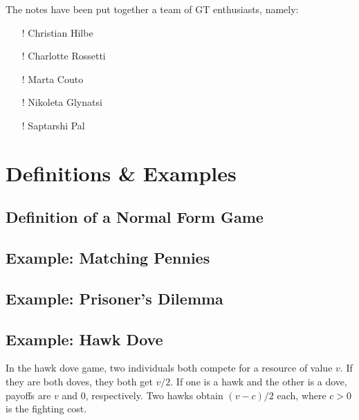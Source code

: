 \documentclass{article}
\begin{document}
The notes have been put together a team of GT enthusiasts, namely:

\begin{itemize}
    \item [!] Christian Hilbe
    \item [!] Charlotte Rossetti
    \item [!] Marta Couto
    \item [!] Nikoleta Glynatsi
    \item [!] Saptarshi Pal
\end{itemize}

\section{Definitions \& Examples}

\subsection{Definition of a Normal Form Game}





\subsection{Example: Matching Pennies}





\subsection{Example: Prisoner's Dilemma}





\subsection{Example: Hawk Dove}
In the hawk dove game, two individuals both compete for a resource of value $v$. 
If they are both doves, they both get $v/2$. If one is a hawk and the other is a dove, 
payoffs are $v$ and $0$, respectively. Two hawks obtain $(v-c)/2$ each, where $c>0$ is the fighting cost.
\end{document}
